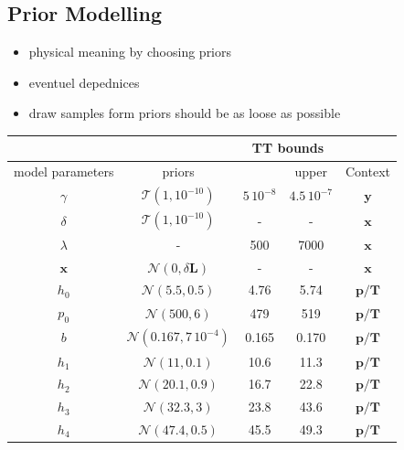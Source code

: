 \subsection{Prior Modelling}
\begin{itemize}
	\item physical meaning by choosing priors
	\item eventuel depednices
	\item draw samples form priors should be as loose as possible
\end{itemize}
\begin{table}
	\centering
	\begin{tabular}{ |c||c|c|c|c|   }
		\hline
		& &\multicolumn{2}{|c|}{TT bounds}&\\
		\hline
		model parameters& priors&\makecell{lower}& \makecell{upper\\
		}&Context\\
		\hhline{|=||=|=|=|=|}
		$\gamma$ & $\mathcal{T}(1,10^{-10})$ &$5 \, 10^{-8}$ &$4.5 \, 10^{-7}$& $\bm{y}$\\ \hline
		$\delta$ &$\mathcal{T}(1,10^{-10})$ & -&-& $\bm{x}$\\ \hline
		$\lambda$ &- & 500&7000& $\bm{x}$\\ \hline
		$\bm{x}$ &$\mathcal{N}(0,\delta \bm{L})$ & -&-& $\bm{x}$\\ \hhline{|=||=|=|=|=|}
		$h_0$ &  $\mathcal{N}(5.5,0.5)$& 4.76&5.74&$\bm{p/T}$\\ \hline
		$p_0$ &  $\mathcal{N}(500,6)$&479 &519&$\bm{p/T}$\\ \hline
		$b$ &  $\mathcal{N}(0.167,7\,10^{-4})$& 0.165& 0.170 &$\bm{p/T}$\\ \hline
		$h_{1}$ &  $\mathcal{N}(11,0.1)$&10.6 &11.3&$\bm{p/T}$\\ \hline
		$h_{2}$ &  $\mathcal{N}(20.1,0.9)$&16.7 &22.8&$\bm{p/T}$\\ \hline
		$h_{3}$ &  $\mathcal{N}(32.3,3)$&23.8&43.6&$\bm{p/T}$\\ \hline
		$h_{4}$ &  $\mathcal{N}(47.4,0.5)$&45.5 &49.3&$\bm{p/T}$\\ \hline

\end{tabular}
\end{table}
